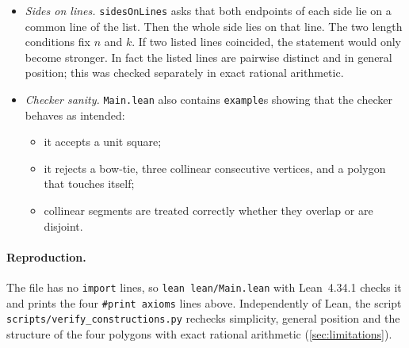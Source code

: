 \begin{itemize}
  the boundary is a Jordan polygon with $k$ sides, as in the definition in \cref{sec:reduction}.
\item \emph{Sides on lines.} \texttt{sidesOnLines} asks that both endpoints of each side lie on a
  common line of the list. Then the whole side lies on that line. The two length conditions fix $n$
  and $k$. If two listed lines coincided, the statement would only become stronger. In fact the listed
  lines are pairwise distinct and in general position; this was checked separately in exact rational
  arithmetic.
\item \emph{Checker sanity.} \texttt{Main.lean} also contains \texttt{example}s showing that the checker
  behaves as intended:
  \begin{itemize}
  \item it accepts a unit square;
  \item it rejects a bow-tie, three collinear consecutive vertices, and a polygon that touches itself;
  \item collinear segments are treated correctly whether they overlap or are disjoint.
  \end{itemize}
\end{itemize}

\paragraph{Reproduction.}
The file has no \texttt{import} lines, so \texttt{lean lean/Main.lean} with Lean~4.34.1 checks it and
prints the four \texttt{\#print axioms} lines above. Independently of Lean, the script
\texttt{scripts/verify\_constructions.py} rechecks simplicity, general position and the structure of the
four polygons with exact rational arithmetic (\cref{sec:limitations}).
